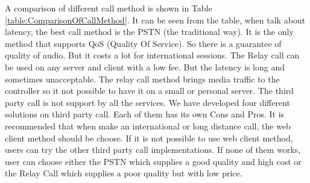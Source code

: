 A comparison of different call method is shown in Table \ref{table:ComparisonOfCallMethod}. It can be seen from the table, when talk about latency, the best call method is the PSTN (the traditional way). It is the only method that supports QoS\label{sym:QOS} (Quality Of Service). So there is a guarantee of quality of audio. But it costs a lot for international sessions.  The Relay call can be used on any server and client with a low fee. But the latency is long and sometimes unacceptable. The relay call method brings media traffic to the controller so it not possible to have it on a small or personal server. The third party call is not support by all the services. We have developed four different solutions on third party call. Each of them has its own Cons and Pros. It is recommended that when make an international or long distance call, the web client method should be choose. If it is not possible to use web client method, users can try the other third party call implementations. If none of them works, user can choose either the PSTN which supplies a good quality and high cost or the \textsf{Relay Call} which supplies a poor quality but with low price.


